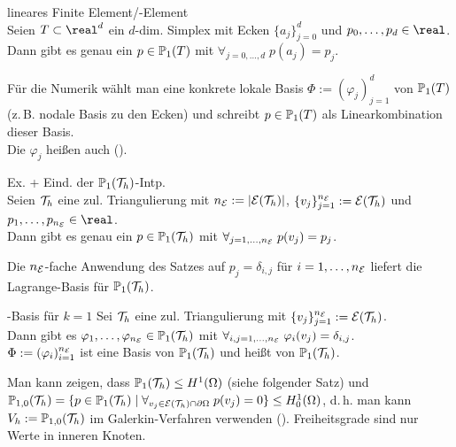 \begin{Satz}{lineares Finite Element/-Element}\\
    Seien $T \subset \real^d$ ein $d$-dim. Simplex mit Ecken $\{a_j\}_{j=0}^d$
    und $p_0, \dotsc, p_d \in \real$.\\
    Dann gibt es genau ein $p \in \mathbb{P}_1(T)$ mit $\forall_{j=0,\dotsc,d}\; p(a_j) = p_j$.
\end{Satz}

\begin{Bem}
    Für die Numerik wählt man eine konkrete lokale Basis $\Phi := (\varphi_j)_{j=1}^d$ von
    $\mathbb{P}_1(T)$ (z.\,B. nodale Basis zu den Ecken) und schreibt $p \in \mathbb{P}_1(T)$
    als Linearkombination dieser Basis.\\
    Die $\varphi_j$ heißen auch  ().
\end{Bem}

\linie

\begin{Satz}{Ex. + Eind. der $\mathbb{P}_1(\mathcal{T}_h)$-Intp.}\\
    Seien $\mathcal{T}_h$ eine zul. Triangulierung mit $n_{\mathcal{E}} := |\mathcal{E}(\mathcal{T}_h)|$,
    $\{v_j\}_{j=1}^{n_{\mathcal{E}}} := \mathcal{E}(\mathcal{T}_h)$ und $p_1, \dotsc, p_{n_\E} \in \real$.\\
    Dann gibt es genau ein $p \in \mathbb{P}_1(\mathcal{T}_h)$ mit
    $\forall_{j=1,\dotsc,n_{\mathcal{E}}}\; p(v_j) = p_j$.
\end{Satz}

\linie

\begin{Bem}
    Die $n_{\mathcal{E}}$-fache Anwendung des Satzes auf $p_j = \delta_{i,j}$ für
    $i = 1, \dotsc, n_{\mathcal{E}}$ liefert die Lagrange-Basis für $\mathbb{P}_1(\mathcal{T}_h)$.
\end{Bem}

\begin{Satz}{-Basis für $k = 1$}
    Sei $\mathcal{T}_h$ eine zul. Triangulierung mit $\{v_j\}_{j=1}^{n_{\mathcal{E}}} := \mathcal{E}(\mathcal{T}_h)$.\\
    Dann gibt es $\varphi_1, \dotsc, \varphi_{n_{\mathcal{E}}} \in \mathbb{P}_1(\mathcal{T}_h)$ mit
    $\forall_{i,j=1,\dotsc,n_{\mathcal{E}}}\; \varphi_i(v_j) = \delta_{i,j}$.\\
    $\Phi := (\varphi_i)_{i=1}^{n_{\mathcal{E}}}$ ist eine Basis von $\mathbb{P}_1(\mathcal{T}_h)$
    und heißt  von $\mathbb{P}_1(\mathcal{T}_h)$.
\end{Satz}

\begin{Bem}
    Man kann zeigen, dass
    $\mathbb{P}_1(\mathcal{T}_h) \le H^1(\Omega)$ (siehe folgender Satz) und\\
    $\mathbb{P}_{1,0}(\mathcal{T}_h) =
    \{p \in \mathbb{P}_1(\mathcal{T}_h) \;|\; \forall_{v_j \in \mathcal{E}(\mathcal{T}_h) \cap \partial\Omega}\; p(v_j) = 0\}
    \le H^1_0(\Omega)$,
    d.\,h. man kann $V_h := \mathbb{P}_{1,0}(\mathcal{T}_h)$ im Galerkin-Verfahren verwenden
    ().
    Freiheitsgrade sind nur Werte in inneren Knoten.
\end{Bem}

